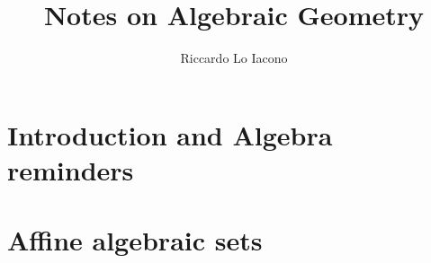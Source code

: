 \documentclass[draft]{lectures2}
\title{Notes on Algebraic Geometry}
\author{Riccardo Lo Iacono}
\begin{document}
    \maketitle

    \section{Introduction and Algebra reminders}
    

    \section{Affine algebraic sets}
    
\end{document}
